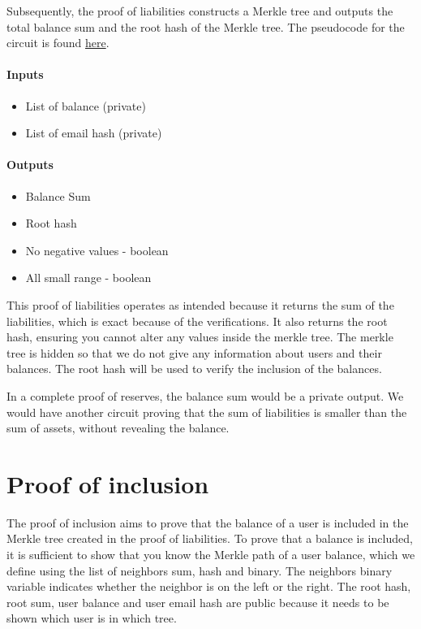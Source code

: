 Subsequently, the proof of liabilities constructs a Merkle tree and outputs the total balance sum and the root hash of the Merkle tree.
The pseudocode for the circuit is found \hyperref[subsec:plc]{here}.

\paragraph{Inputs}
\begin{itemize}
   \item List of balance (private)
   \item List of email hash (private)
   \end{itemize}

\paragraph{Outputs}
\begin{itemize}
   \item Balance Sum 
   \item Root hash
   \item No negative values - boolean
   \item All small range - boolean
   \end{itemize}

This proof of liabilities operates as intended because it returns the sum of the liabilities, which is exact because of the verifications.
It also returns the root hash, ensuring you cannot alter any values inside the merkle tree. The merkle tree is hidden so that we do not
give any information about users and their balances.
The root hash will be used to verify the inclusion of the balances.

In a complete proof of reserves, the balance sum would be a private output. We would have another circuit proving that the sum of liabilities is smaller
than the sum of assets, without revealing the balance.

\section{Proof of inclusion}
\label{subsec:pi}
The proof of inclusion aims to prove that the balance of a user is included in the Merkle tree created in the proof of liabilities.
To prove that a balance is included, it is sufficient to show that you know the Merkle path of a user balance,
which we define using the list of neighbors sum, hash and binary.
The neighbors binary variable indicates whether the neighbor is on the left or the right.
The root hash, root sum, user balance and user email hash are public because it needs to be shown which user is in which tree.

